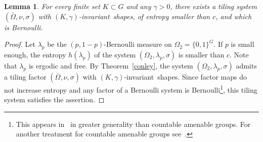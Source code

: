 \documentclass{amsart}
\newtheorem{lem}[thm]{Lemma}
\theoremstyle{remark}
\def \inv {invariant}
\begin{document}
\begin{lem}\label{l1}For every finite set $K\subset G$ and any $\gamma>0$,
there exists a tiling system $(\bar\Omega,\nu,\sigma)$ with $(K,\gamma)$-\inv\ shapes, of entropy smaller than $c$, and which is Bernoulli.
\end{lem}
\begin{proof}
Let $\lambda_p$ be the $(p,1-p)$-Bernoulli measure on $\Omega_2=\{0,1\}^G$. If $p$ is small enough, the entropy $h(\lambda_p)$ of the system $(\Omega_2,\lambda_p,\sigma)$ is smaller than $c$. Note that $\lambda_p$ is ergodic and free. By Theorem~\ref{conley}, the system $(\Omega_2,\lambda_p,\sigma)$ admits a tiling factor $(\bar\Omega,\nu,\sigma)$ with $(K,\gamma)$-\inv\ shapes. Since factor maps do not increase entropy and any factor of a Bernoulli system is Bernoulli\footnote{This appears in~\cite[Theorem~4, p.\,127]{8a} in greater  generality than countable amenable groups. For another treatment for countable amenable groups see~\cite{3a}.}, this tiling system satisfies the assertion.
\end{proof}
\end{document}
